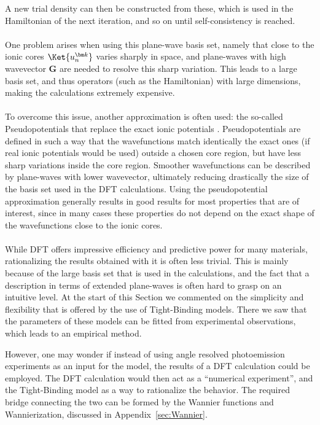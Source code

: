 A new trial density can then be constructed from these, which is used in the Hamiltonian of the next iteration, and so on until self-consistency is reached.
\\\\
One problem arises when using this plane-wave basis set, namely that close to the ionic cores $\Ket{u_n^{\bm k}}$ varies sharply in space, and plane-waves with high wavevector $\bm G$ are needed to resolve this sharp variation.
This leads to a large basis set, and thus operators (such as the Hamiltonian) with large dimensions, making the calculations extremely expensive.
\\\\
To overcome this issue, another approximation is often used: the so-called Pseudopotentials that replace the exact ionic potentials \cite{Hamann1979,Louie1982,Vanderbilt1990,Joubert1999}.
Pseudopotentials are defined in such a way that the wavefunctions match identically the exact ones (if real ionic potentials would be used) outside a chosen core region, but have less sharp variations inside the core region.
Smoother wavefunctions can be described by plane-waves with lower wavevector, ultimately reducing drastically the size of the basis set used in the DFT calculations.
Using the pseudopotential approximation generally results in good results for most properties that are of interest, since in many cases these properties do not depend on the exact shape of the wavefunctions close to the ionic cores.
\\\\
While DFT offers impressive efficiency and predictive power for many materials, rationalizing the results obtained with it is often less trivial.
This is mainly because of the large basis set that is used in the calculations, and the fact that a description in terms of extended plane-waves is often hard to grasp on an intuitive level.
At the start of this Section we commented on the simplicity and flexibility that is offered by the use of Tight-Binding models.
There we saw that the parameters of these models can be fitted from experimental observations, which leads to an empirical method.

However, one may wonder if instead of using angle resolved photoemission experiments as an input for the model, the results of a DFT calculation could be employed.
The DFT calculation would then act as a ``numerical experiment'', and the Tight-Binding model as a way to rationalize the behavior.
The required bridge connecting the two can be formed by the Wannier functions and Wannierization, discussed in Appendix~\ref{sec:Wannier}. 
